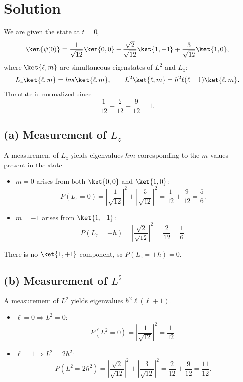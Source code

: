 \documentclass{article}
\begin{document}
\section*{Solution}

We are given the state at $t=0$,
\[
\ket{\psi(0)}
=
\frac{1}{\sqrt{12}}\ket{0,0}
+
\frac{\sqrt{2}}{\sqrt{12}}\ket{1,-1}
+
\frac{3}{\sqrt{12}}\ket{1,0},
\]
where $\ket{\ell,m}$ are simultaneous eigenstates of $L^2$ and $L_z$:
\[
L_z\ket{\ell,m}=\hbar m\ket{\ell,m},\qquad
L^2\ket{\ell,m}=\hbar^2\ell(\ell+1)\ket{\ell,m}.
\]
The state is normalized since
\[
\frac{1}{12}+\frac{2}{12}+\frac{9}{12}=1.
\]

\subsection*{(a) Measurement of $L_z$}

A measurement of $L_z$ yields eigenvalues $\hbar m$ corresponding to the $m$ values
present in the state.

\begin{itemize}
\item $m=0$ arises from both $\ket{0,0}$ and $\ket{1,0}$:
\[
P(L_z=0)
=
\left|\frac{1}{\sqrt{12}}\right|^2
+
\left|\frac{3}{\sqrt{12}}\right|^2
=
\frac{1}{12}+\frac{9}{12}
=
\frac{5}{6}.
\]

\item $m=-1$ arises from $\ket{1,-1}$:
\[
P(L_z=-\hbar)
=
\left|\frac{\sqrt{2}}{\sqrt{12}}\right|^2
=
\frac{2}{12}
=
\frac{1}{6}.
\]
\end{itemize}

There is no $\ket{1,+1}$ component, so $P(L_z=+\hbar)=0$.

\subsection*{(b) Measurement of $L^2$}

A measurement of $L^2$ yields eigenvalues $\hbar^2\ell(\ell+1)$.

\begin{itemize}
\item $\ell=0 \Rightarrow L^2=0$:
\[
P(L^2=0)
=
\left|\frac{1}{\sqrt{12}}\right|^2
=
\frac{1}{12}.
\]

\item $\ell=1 \Rightarrow L^2=2\hbar^2$:
\[
P(L^2=2\hbar^2)
=
\left|\frac{\sqrt{2}}{\sqrt{12}}\right|^2
+
\left|\frac{3}{\sqrt{12}}\right|^2
=
\frac{2}{12}+\frac{9}{12}
=
\frac{11}{12}.
\]
\end{itemize}
\end{document}
